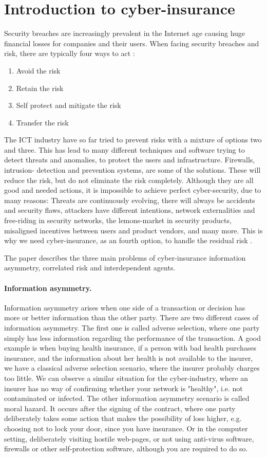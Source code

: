 \section{Introduction to cyber-insurance}
Security breaches are increasingly prevalent in the Internet age causing huge financial losses
for companies and their users. When facing security breaches and risk, there are typically four ways to act \cite{bolot:cyber}:
\begin{enumerate}
\item Avoid the risk
\item Retain the risk
\item Self protect and mitigate the risk
\item Transfer the risk
\end{enumerate}
The ICT industry have so far tried to prevent risks with a mixture of options two and three. This has lead to many different techniques and software trying to detect threats and anomalies, to protect the users and infrastructure. Firewalls, intrusion- detection and prevention systems, are some of the solutions. These will reduce the risk, but do not eliminate the risk completely. Although they are all good and needed actions, it is impossible to achieve perfect cyber-security, due to many reasons: Threats are continuously evolving, there will always be accidents and security flaws, attackers have different intentions, network externalities and free-riding in security networks, the lemons-market in security products, misaligned incentives between users and product vendors, and many more. 
This is why we need cyber-insurance, as an fourth option, to handle the residual risk \cite{bolot:cyber2,ranjan:cyber}.

  The paper  \cite{bohme2010modeling} describes the three main problems of cyber-insurance information asymmetry, correlated risk and interdependent agents. 
  \paragraph{Information asymmetry.}
Information asymmetry arises when one side of a transaction or decision has more or better information than the other party. There are two different cases of information asymmetry. The first one is called adverse selection, where one party simply has less information regarding the performance of the transaction. A good example is when buying health insurance, if a person with bad health purchases insurance, and the information about her health is not available to the insurer, we have a classical adverse selection scenario, where the insurer probably charges too little. We can observe a similar situation for the cyber-industry, where an insurer has no way of confirming whether your network is "healthy", i.e. not contaminated or infected. 
The other information asymmetry scenario is called moral hazard. It occurs after the signing of the contract, where one party deliberately takes some action that makes the possibility of loss higher, e.g. choosing not to lock your door, since you have insurance. Or in the computer setting, deliberately visiting hostile web-pages, or not using anti-virus software, firewalls or other self-protection software, although you are required to do so. 
    

